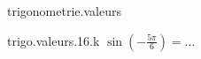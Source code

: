 \begin{qcm}{trigonometrie.valeurs}
    \begin{question}{trigo.valeurs.16.k}
         \({\sin\left(-\frac{5\pi}{6}\right)}=\ldots\)
         \vspace{-1.5ex}
         \begin{multicols}{3}
            \begin{reponses}
                \lastchoices
            \end{reponses}
        \end{multicols}
    \end{question}
\end{qcm}
